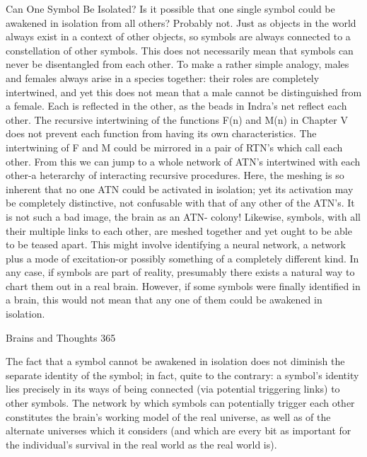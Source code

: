                           Can One Symbol Be Isolated?
Is it possible that one single symbol could be awakened in isolation from all others?
Probably not. Just as objects in the world always exist in a context of other objects, so
symbols are always connected to a constellation of other symbols. This does not
necessarily mean that symbols can never be disentangled from each other. To make a
rather simple analogy, males and females always arise in a species together: their roles
are completely intertwined, and yet this does not mean that a male cannot be
distinguished from a female. Each is reflected in the other, as the beads in Indra's net
reflect each other. The recursive intertwining of the functions F(n) and M(n) in Chapter V
does not prevent each function from having its own characteristics. The intertwining of F
and M could be mirrored in a pair of RTN's which call each other. From this we can jump
to a whole network of ATN's intertwined with each other-a heterarchy of interacting
recursive procedures. Here, the meshing is so inherent that no one ATN could be
activated in isolation; yet its activation may be completely distinctive, not confusable
with that of any other of the ATN's. It is not such a bad image, the brain as an ATN-
colony!
Likewise, symbols, with all their multiple links to each other, are meshed together and
yet ought to be able to be teased apart. This might involve identifying a neural network, a
network plus a mode of excitation-or possibly something of a completely different kind.
In any case, if symbols are part of reality, presumably there exists a natural way to chart
them out in a real brain. However, if some symbols were finally identified in a brain, this
would not mean that any one of them could be awakened in isolation.




Brains and Thoughts                                                                     365

        The fact that a symbol cannot be awakened in isolation does not diminish the
separate identity of the symbol; in fact, quite to the contrary: a symbol's identity lies
precisely in its ways of being connected (via potential triggering links) to other symbols.
The network by which symbols can potentially trigger each other constitutes the brain's
working model of the real universe, as well as of the alternate universes which it
considers (and which are every bit as important for the individual's survival in the real
world as the real world is).

